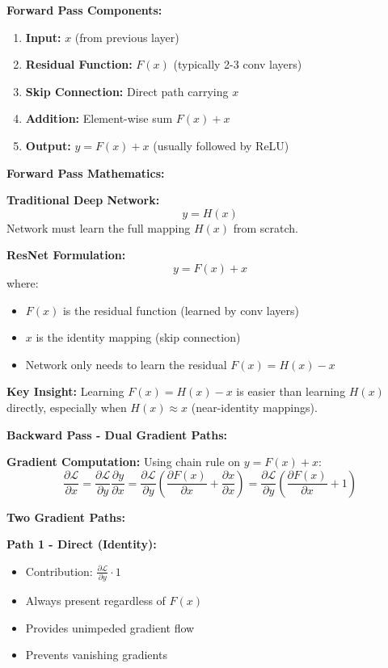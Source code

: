 \documentclass[12pt]{article}
\begin{document}
\begin{enumerate}[(a)]
{    \textbf{Forward Pass Components:}
    \begin{enumerate}
        \item \textbf{Input:} $x$ (from previous layer)
        \item \textbf{Residual Function:} $F(x)$ (typically 2-3 conv layers)
        \item \textbf{Skip Connection:} Direct path carrying $x$
        \item \textbf{Addition:} Element-wise sum $F(x) + x$
        \item \textbf{Output:} $y = F(x) + x$ (usually followed by ReLU)
    \end{enumerate}
    
    \textbf{Forward Pass Mathematics:}
    
    \textbf{Traditional Deep Network:}
    $$y = H(x)$$
    Network must learn the full mapping $H(x)$ from scratch.
    
    \textbf{ResNet Formulation:}
    $$y = F(x) + x$$
    where:
    \begin{itemize}
        \item $F(x)$ is the residual function (learned by conv layers)
        \item $x$ is the identity mapping (skip connection)
        \item Network only needs to learn the residual $F(x) = H(x) - x$
    \end{itemize}
    
    \textbf{Key Insight:} Learning $F(x) = H(x) - x$ is easier than learning $H(x)$ directly, especially when $H(x) \approx x$ (near-identity mappings).
    
    \textbf{Backward Pass - Dual Gradient Paths:}
    
    \textbf{Gradient Computation:}
    Using chain rule on $y = F(x) + x$:
    $$\frac{\partial \mathcal{L}}{\partial x} = \frac{\partial \mathcal{L}}{\partial y} \frac{\partial y}{\partial x} = \frac{\partial \mathcal{L}}{\partial y} \left(\frac{\partial F(x)}{\partial x} + \frac{\partial x}{\partial x}\right) = \frac{\partial \mathcal{L}}{\partial y} \left(\frac{\partial F(x)}{\partial x} + 1\right)$$
    
    \textbf{Two Gradient Paths:}
    
    \textbf{Path 1 - Direct (Identity):}
    \begin{itemize}
        \item Contribution: $\frac{\partial \mathcal{L}}{\partial y} \cdot 1$
        \item Always present regardless of $F(x)$
        \item Provides unimpeded gradient flow
        \item Prevents vanishing gradients
    \end{itemize}
    
}
\end{enumerate}
\end{document}
